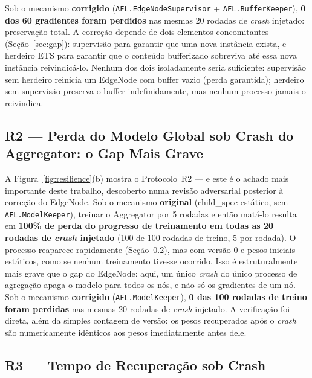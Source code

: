 \documentclass[conference,a4paper]{IEEEtran}
\begin{document}
Sob o mecanismo \textbf{corrigido} (\texttt{AFL.EdgeNodeSupervisor} +
\texttt{AFL.BufferKeeper}), \textbf{0 dos 60 gradientes foram perdidos} nas
mesmas 20 rodadas de \textit{crash} injetado: preservação total. A
correção depende de dois elementos concomitantes (Seção~\ref{sec:gap}):
supervisão para garantir que uma nova instância exista, e herdeiro ETS
para garantir que o conteúdo bufferizado sobreviva até essa nova instância
reivindicá-lo. Nenhum dos dois isoladamente seria suficiente: supervisão
sem herdeiro reinicia um EdgeNode com buffer vazio (perda garantida);
herdeiro sem supervisão preserva o buffer indefinidamente, mas nenhum
processo jamais o reivindica.

\subsection{R2 --- Perda do Modelo Global sob Crash do Aggregator: o Gap Mais Grave}
\label{sec:r2}

A Figura~\ref{fig:resilience}(b) mostra o Protocolo~R2 --- e este é o
achado mais importante deste trabalho, descoberto numa revisão adversarial
posterior à correção do EdgeNode. Sob o mecanismo \textbf{original}
(child\_spec estático, sem \texttt{AFL.ModelKeeper}), treinar o Aggregator
por 5 rodadas e então matá-lo resulta em \textbf{100\% de perda do
progresso de treinamento em todas as 20 rodadas de \textit{crash}
injetado} (100 de 100 rodadas de treino, 5 por rodada). O processo
reaparece rapidamente (Seção~\ref{sec:r3}), mas com versão 0 e pesos
iniciais estáticos, como se nenhum treinamento tivesse ocorrido. Isso é
estruturalmente mais grave que o gap do EdgeNode: aqui, um único
\textit{crash} do único processo de agregação apaga o modelo para todos
os nós, e não só os gradientes de um nó. Sob o mecanismo
\textbf{corrigido} (\texttt{AFL.ModelKeeper}), \textbf{0 das 100 rodadas
de treino foram perdidas} nas mesmas 20 rodadas de \textit{crash}
injetado. A verificação foi direta, além da simples contagem de versão:
os pesos recuperados após o \textit{crash} são numericamente idênticos
aos pesos imediatamente antes dele.

\subsection{R3 --- Tempo de Recuperação sob Crash}
\label{sec:r3}
\end{document}
